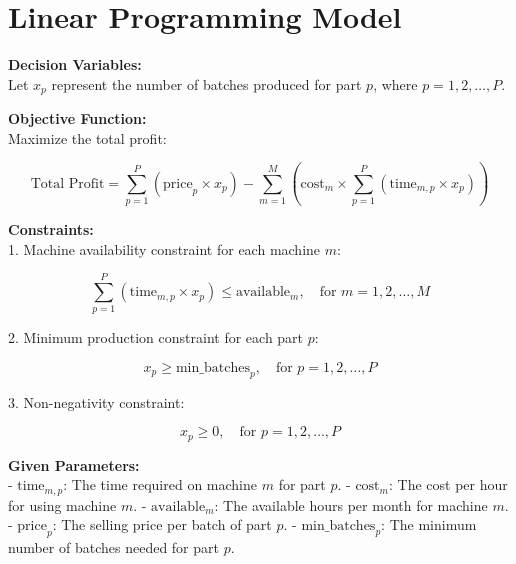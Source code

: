 \documentclass{article}
\begin{document}
\section*{Linear Programming Model}

\textbf{Decision Variables:} \\
Let \( x_p \) represent the number of batches produced for part \( p \), where \( p = 1, 2, \ldots, P \).

\textbf{Objective Function:} \\
Maximize the total profit:

\[
\text{Total Profit} = \sum_{p=1}^{P} \left( \text{price}_p \times x_p \right) - \sum_{m=1}^{M} \left( \text{cost}_m \times \sum_{p=1}^{P} \left( \text{time}_{m,p} \times x_p \right) \right)
\]

\textbf{Constraints:} \\
1. Machine availability constraint for each machine \( m \):

\[
\sum_{p=1}^{P} \left( \text{time}_{m,p} \times x_p \right) \leq \text{available}_m, \quad \text{for } m = 1, 2, \ldots, M
\]

2. Minimum production constraint for each part \( p \):

\[
x_p \geq \text{min\_batches}_p, \quad \text{for } p = 1, 2, \ldots, P
\]

3. Non-negativity constraint:

\[
x_p \geq 0, \quad \text{for } p = 1, 2, \ldots, P
\]

\textbf{Given Parameters:} \\
- \(\text{time}_{m,p}\): The time required on machine \( m \) for part \( p \).
- \(\text{cost}_m\): The cost per hour for using machine \( m \).
- \(\text{available}_m\): The available hours per month for machine \( m \).
- \(\text{price}_p\): The selling price per batch of part \( p \).
- \(\text{min\_batches}_p\): The minimum number of batches needed for part \( p \).
\end{document}
